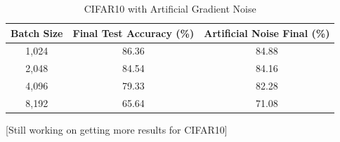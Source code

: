 \documentclass{article} %
\begin{document}
\begin{table}[h]
\begin{center}
\begin{tabular}{ c c c}
 Batch Size & Final Test Accuracy (\%) & Artificial Noise Final (\%) \\ 
 \hline
 1,024 & 86.36 & 84.88 \\
 2,048 & 84.54 & 84.16 \\
 4,096 & 79.33 & 82.28 \\  
 8,192 & 65.64 & 71.08 \\
\end{tabular}
\end{center}
\caption{CIFAR10 with Artificial Gradient Noise}
\label{tab:cifar10_noise}
\end{table}

[Still working on getting more results for CIFAR10]

%
%

%
%
\end{document}
